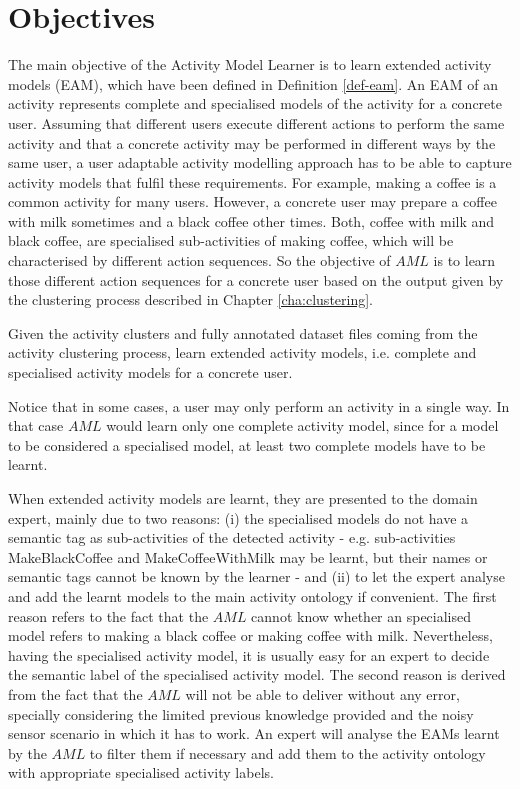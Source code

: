 \section{Objectives}
\label{sec:learner:objectives}

The main objective of the Activity Model Learner is to learn extended activity models (EAM), which have been defined in Definition \ref{def-eam}. An EAM of an activity represents complete and specialised models of the activity for a concrete user. Assuming that different users execute different actions to perform the same activity and that a concrete activity may be performed in different ways by the same user, a user adaptable activity modelling approach has to be able to capture activity models that fulfil these requirements. For example, making a coffee is a common activity for many users. However, a concrete user may prepare a coffee with milk sometimes and a black coffee other times. Both, coffee with milk and black coffee, are specialised sub-activities of making coffee, which will be characterised by different action sequences. So the objective of $AML$ is to learn those different action sequences for a concrete user based on the output given by the clustering process described in Chapter \ref{cha:clustering}.

\begin{problem}[$AML$]
\label{pro-aml}
 Given the activity clusters and fully annotated dataset files coming from the activity clustering process, learn extended activity models, i.e. complete and specialised activity models for a concrete user.
\end{problem}

Notice that in some cases, a user may only perform an activity in a single way. In that case $AML$ would learn only one complete activity model, since for a model to be considered a specialised model, at least two complete models have to be learnt. 

When extended activity models are learnt, they are presented to the domain expert, mainly due to two reasons: (i) the specialised models do not have a semantic tag as sub-activities of the detected activity - e.g. sub-activities MakeBlackCoffee and MakeCoffeeWithMilk may be learnt, but their names or semantic tags cannot be known by the learner - and (ii) to let the expert analyse and add the learnt models to the main activity ontology if convenient. The first reason refers to the fact that the $AML$ cannot know whether an specialised model refers to making a black coffee or making coffee with milk. Nevertheless, having the specialised activity model, it is usually easy for an expert to decide the semantic label of the specialised activity model. The second reason is derived from the fact that the $AML$ will not be able to deliver without any error, specially considering the limited previous knowledge provided and the noisy sensor scenario in which it has to work. An expert will analyse the EAMs learnt by the $AML$ to filter them if necessary and add them to the activity ontology with appropriate specialised activity labels.

